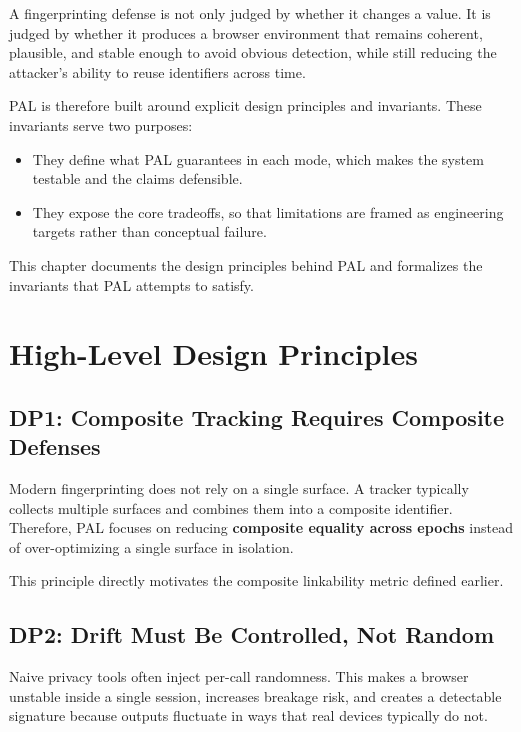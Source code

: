 \documentclass[11pt]{report}
\begin{document}
A fingerprinting defense is not only judged by whether it changes a value. It is judged by whether it produces a browser environment that remains coherent, plausible, and stable enough to avoid obvious detection, while still reducing the attacker’s ability to reuse identifiers across time.

PAL is therefore built around explicit design principles and invariants. These invariants serve two purposes:

\begin{itemize}
    \item They define what PAL guarantees in each mode, which makes the system testable and the claims defensible.
    \item They expose the core tradeoffs, so that limitations are framed as engineering targets rather than conceptual failure.
\end{itemize}

This chapter documents the design principles behind PAL and formalizes the invariants that PAL attempts to satisfy.

\section{High-Level Design Principles}

\subsection{DP1: Composite Tracking Requires Composite Defenses}

Modern fingerprinting does not rely on a single surface. A tracker typically collects multiple surfaces and combines them into a composite identifier. Therefore, PAL focuses on reducing \textbf{composite equality across epochs} instead of over-optimizing a single surface in isolation.

This principle directly motivates the composite linkability metric defined earlier.

\subsection{DP2: Drift Must Be Controlled, Not Random}

Naive privacy tools often inject per-call randomness. This makes a browser unstable inside a single session, increases breakage risk, and creates a detectable signature because outputs fluctuate in ways that real devices typically do not.
\end{document}
